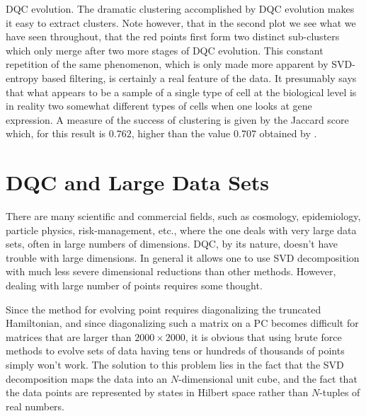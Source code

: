 \documentclass[fleqn,twoside]{article}
\begin{document}
DQC evolution.  The dramatic clustering accomplished by DQC
evolution makes it easy to extract clusters.  Note however, that in
the second plot we see what we have seen throughout, that the red
points first form two distinct sub-clusters which only merge after
two more stages of DQC evolution.  This constant repetition of the
same phenomenon, which is only made more apparent by SVD-entropy based
filtering, is certainly a real feature of the data.  It presumably
says that what appears to be a sample of a single type of cell at
the biological level is in reality two somewhat different types of
cells when one looks at gene expression. A measure of the success of clustering
is given by the Jaccard score which, for this result
is $0.762$, higher than the value 0.707 obtained by \cite{featsel}.

\section{DQC and Large Data Sets}


There are many scientific and commercial fields, such as cosmology,
epidemiology, particle physics, risk-management, etc., where the
one deals with very large data sets, often in large
numbers of dimensions. DQC, by its nature, doesn't have
trouble with large dimensions.  In general it allows one to use
SVD decomposition with much less severe dimensional reductions
than other methods.  However, dealing with large number of points
requires some thought.

Since the method for evolving point requires diagonalizing the
truncated Hamiltonian, and since diagonalizing such a matrix
on a PC becomes difficult for matrices that are larger than
$2000 \times 2000$, it is obvious that using brute force
methods to evolve sets of data having tens or hundreds of
thousands of points simply won't work.  The solution
to this problem lies in the fact that
the SVD decomposition maps the data into an $N$-dimensional
unit cube, and the fact that the data points are represented by states in
Hilbert space rather than $N$-tuples of real numbers.
\end{document}
